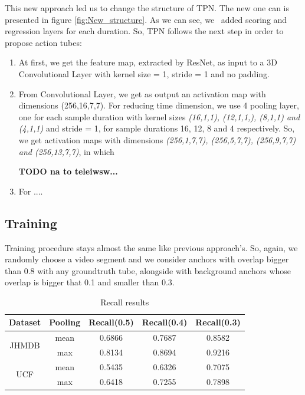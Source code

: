 This new approach led us to change the structure of TPN. The new one can is presented in figure \ref{fig:New_structure}. As we can see, we \
added scoring and regression layers for each duration. So, TPN follows the next step in order to propose action tubes:
\begin{enumerate}
\item At first, we get the feature map, extracted by ResNet, as input to a 3D Convolutional Layer with kernel size = 1, stride = 1 and no padding.
\item From Convolutional Layer, we get as output an activation map with dimensions (256,16,7,7). For reducing time dimension, we use 4 pooling layer,
  one for each sample duration with kernel sizes \textit{(16,1,1), (12,1,1,), (8,1,1) and (4,1,1)} and stride = 1,  for sample durations 16, 12, 8 and 4 respectively.
  So, we get activation maps with dimensions \textit{(256,1,7,7), (256,5,7,7), (256,9,7,7) and (256,13,7,7)}, in which

  \textbf{TODO na to teleiwsw...}
\item For ....
\end{enumerate}

\subsection{Training}
Training procedure stays almost the same like previous approach's. So, again, we randomly choose  a video segment and we consider anchors with overlap bigger than 0.8 with any groundtruth
tube, alongside with background anchors whose overlap is bigger that 0.1 and smaller than 0.3.

\begin{table}[h]
  \centering
  \begin{tabular}{||c | c || c  c c||}
    \hline
    \textbf{Dataset} & \textbf{Pooling} &  \textbf{Recall(0.5)} & \textbf{Recall(0.4)} & \textbf{Recall(0.3)} \\
    \hline  \hline
    \multirow{2}{4em}{JHMDB} & mean & 0.6866 & 0.7687 & 0.8582 \\
    \cline{2-5}
    {} & max &  0.8134 & 0.8694 & 0.9216 \\
    \hline
    \multirow{2}{4em}{UCF} & mean &  0.5435 & 0.6326 & 0.7075 \\
    \cline{2-5}
    {} & max & 0.6418 & 0.7255 & 0.7898 \\
    \hline
  \end{tabular}
  \caption{Recall results}
  \label{table:tpn_2_1}
\end{table}

